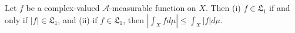 Let $f$ be a complex-valued $\mathcal{A}$-measurable function on $X$. Then (i) $f \in \mathfrak{L}_1$ if and only if $|f| \in \mathfrak{L}_1$, and (ii) if $f \in \mathfrak{L}_1$, then $\left| \int_X f d\mu \right| \leq \int_X |f| d\mu$.
